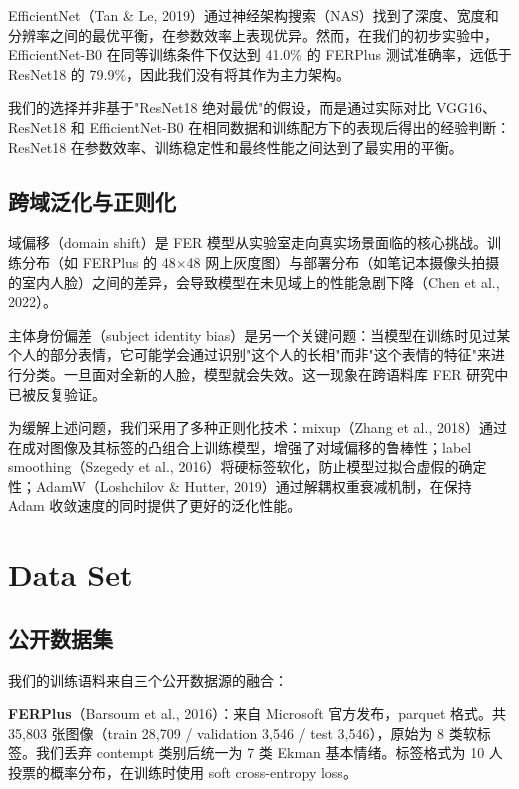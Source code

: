 \documentclass[12pt,a4paper]{article}
\begin{document}
EfficientNet（Tan \& Le, 2019）通过神经架构搜索（NAS）找到了深度、宽度和分辨率之间的最优平衡，在参数效率上表现优异。然而，在我们的初步实验中，EfficientNet-B0 在同等训练条件下仅达到 41.0\% 的 FERPlus 测试准确率，远低于 ResNet18 的 79.9\%，因此我们没有将其作为主力架构。

我们的选择并非基于"ResNet18 绝对最优"的假设，而是通过实际对比 VGG16、ResNet18 和 EfficientNet-B0 在相同数据和训练配方下的表现后得出的经验判断：ResNet18 在参数效率、训练稳定性和最终性能之间达到了最实用的平衡。

\subsection{跨域泛化与正则化}

域偏移（domain shift）是 FER 模型从实验室走向真实场景面临的核心挑战。训练分布（如 FERPlus 的 48×48 网上灰度图）与部署分布（如笔记本摄像头拍摄的室内人脸）之间的差异，会导致模型在未见域上的性能急剧下降（Chen et al., 2022）。

主体身份偏差（subject identity bias）是另一个关键问题：当模型在训练时见过某个人的部分表情，它可能学会通过识别"这个人的长相"而非"这个表情的特征"来进行分类。一旦面对全新的人脸，模型就会失效。这一现象在跨语料库 FER 研究中已被反复验证。

为缓解上述问题，我们采用了多种正则化技术：mixup（Zhang et al., 2018）通过在成对图像及其标签的凸组合上训练模型，增强了对域偏移的鲁棒性；label smoothing（Szegedy et al., 2016）将硬标签软化，防止模型过拟合虚假的确定性；AdamW（Loshchilov \& Hutter, 2019）通过解耦权重衰减机制，在保持 Adam 收敛速度的同时提供了更好的泛化性能。

\section{Data Set}

\subsection{公开数据集}

我们的训练语料来自三个公开数据源的融合：

\textbf{FERPlus}（Barsoum et al., 2016）：来自 Microsoft 官方发布，parquet 格式。共 35,803 张图像（train 28,709 / validation 3,546 / test 3,546），原始为 8 类软标签。我们丢弃 contempt 类别后统一为 7 类 Ekman 基本情绪。标签格式为 10 人投票的概率分布，在训练时使用 soft cross-entropy loss。
\end{document}
